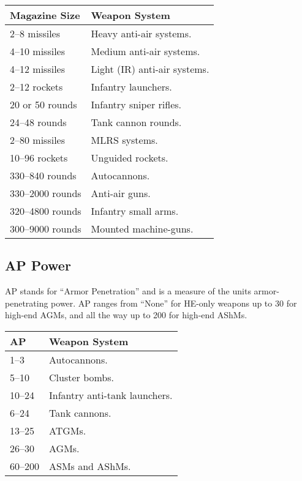 \documentclass{article}
\begin{document}
\begin{center}
    \begin{tabular}{ | l | l | }
    \hline
    Magazine Size & Weapon System \\ \hline
    2--8 missiles & Heavy anti-air systems. \\
    4--10 missiles & Medium anti-air systems. \\ 
    4--12 missiles & Light (IR) anti-air systems. \\
    2--12 rockets & Infantry launchers. \\
    20 or 50 rounds & Infantry sniper rifles. \\
    24--48 rounds & Tank cannon rounds. \\ 
    2--80 missiles & MLRS systems. \\
    10--96 rockets & Unguided rockets. \\
    330--840 rounds & Autocannons. \\
    330--2000 rounds & Anti-air guns. \\
    320--4800 rounds & Infantry small arms. \\
    300--9000 rounds & Mounted machine-guns. \\ \hline
    \end{tabular}
\end{center}

\subsection{AP Power}

AP stands for ``Armor Penetration'' and is a measure of the units
armor-penetrating power. AP ranges from ``None'' for HE-only weapons up to 30
for high-end AGMs, and all the way up to 200 for high-end AShMs.

\begin{center}
    \begin{tabular}{ | l | l | }
    \hline
    AP & Weapon System \\ \hline
    1--3 & Autocannons. \\
    5--10 & Cluster bombs. \\
    10--24 & Infantry anti-tank launchers. \\
    6--24 & Tank cannons. \\
    13--25 & ATGMs. \\
    26--30 & AGMs. \\
    60--200 & ASMs and AShMs. \\
    \hline
    \end{tabular}
\end{center}
\end{document}

